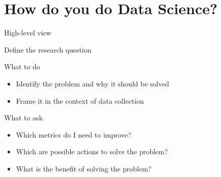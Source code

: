 \section{How do you do Data Science?}

\begin{frame}{High\hyp{}level view}
\end{frame}

\begin{frame}[t]{Define the research question}
    \begin{block}{What to do}
        \begin{itemize}
            \item Identify the problem and why it should be solved
            \item Frame it in the context of data collection
        \end{itemize}
    \end{block}
    \vfill
    \begin{block}{What to ask}
        \begin{itemize}
            \item Which metrics do I need to improve?
            \item Which are possible actions to solve the problem?
            \item What is the benefit of solving the problem?
        \end{itemize}
    \end{block}
\end{frame}

